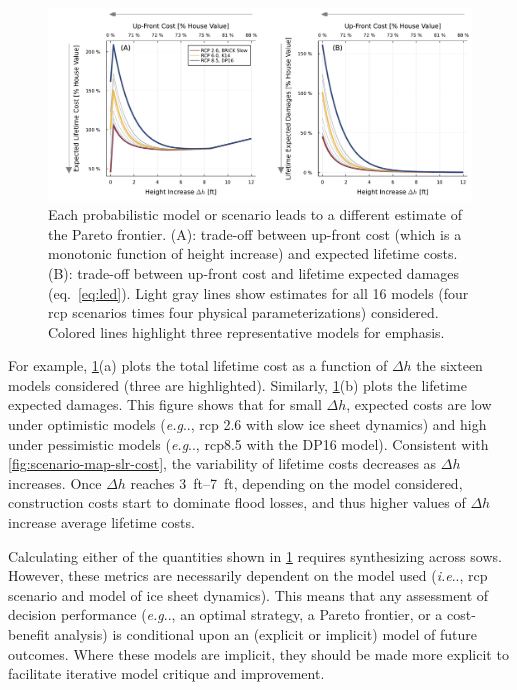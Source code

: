 \documentclass[11pt]{article}
\makeatletter
\DeclareRobustCommand\onedot{\futurelet\@let@token\@onedot}
\def\@onedot{\ifx\@let@token.\else.\null\fi\xspace}
\def\eg{\emph{e.g}\onedot} \def\Eg{\emph{E.g}\onedot}
\def\ie{\emph{i.e}\onedot} \def\Ie{\emph{I.e}\onedot}
\DeclareRobustCommand\onedot{\futurelet\@let@token\@onedot}
\def\@onedot{\ifx\@let@token.\else.\null\fi\xspace}
\def\eg{\emph{e.g}\onedot} \def\Eg{\emph{E.g}\onedot}
\def\ie{\emph{i.e}\onedot} \def\Ie{\emph{I.e}\onedot}
\makeatother
\begin{document}
\begin{figure}
    \centering
    \includegraphics[width=\textwidth]{tradeoffs-by-rcp}
    \caption{
        Each probabilistic model or scenario leads to a different estimate of the Pareto frontier.
        (A): trade-off between up-front cost (which is a monotonic function of height increase) and expected lifetime costs.
        (B): trade-off between up-front cost and lifetime expected damages (eq.~\ref{eq:led}).
        Light gray lines show estimates for all 16 models (four \gls{rcp} scenarios times four physical parameterizations) considered.
        Colored lines highlight three representative models for emphasis.
    }\label{fig:tradeoffs-by-rcp}
\end{figure}

For example, \cref{fig:tradeoffs-by-rcp}(a) plots the total lifetime cost as a function of $\Delta h$ the sixteen models considered (three are highlighted).
Similarly, \cref{fig:tradeoffs-by-rcp}(b) plots the lifetime expected damages.
This figure shows that for small $\Delta h$, expected costs are low under optimistic models (\eg, \gls{rcp} 2.6 with slow ice sheet dynamics) and high under pessimistic models (\eg, \gls{rcp}8.5 with the DP16 model).
Consistent with \cref{fig:scenario-map-slr-cost}, the variability of lifetime costs decreases as $\Delta h$ increases.
Once $\Delta h$ reaches \SIrange[]{3}{7}{ft}, depending on the model considered, construction costs start to dominate flood losses, and thus higher values of $\Delta h$ increase average lifetime costs.

Calculating either of the quantities shown in \cref{fig:tradeoffs-by-rcp} requires synthesizing across \glspl{sow}.
However, these metrics are necessarily dependent on the model used (\ie, \gls{rcp} scenario and model of ice sheet dynamics).
This means that any assessment of decision performance (\eg, an optimal strategy, a Pareto frontier, or a cost-benefit analysis) is conditional upon an (explicit or implicit) model of future outcomes.
Where these models are implicit, they should be made more explicit to facilitate iterative model critique and improvement.
\end{document}
